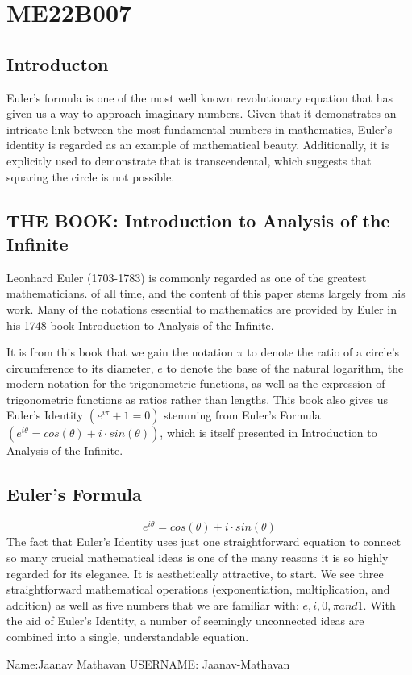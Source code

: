 \section{ME22B007}
\subsection{Introducton}
Euler's formula is one of the most well known revolutionary equation that has given us a way to approach imaginary numbers. Given that it demonstrates an intricate link between the most fundamental numbers in mathematics, Euler's identity is regarded as an example of mathematical beauty. Additionally, it is explicitly used to demonstrate that is transcendental, which suggests that squaring the circle is not possible.
\subsection{THE BOOK: Introduction to Analysis of the Infinite}
Leonhard Euler (1703-1783) is commonly regarded as one of the greatest mathematicians.
of all time, and the content of this paper stems largely from his work.
Many of the notations essential to mathematics are provided by Euler in his 1748 book Introduction to Analysis of the Infinite.

 It is from this book that we gain the
notation $\pi$ to denote the ratio of a circle’s circumference to its diameter, $e$ to denote the base
of the natural logarithm, the modern notation for the trigonometric functions, as well as the
expression of trigonometric functions as ratios rather than lengths. This book also gives us
Euler’s Identity $(e^{i\pi} + 1 = 0)$ stemming from Euler’s Formula $(e^{i\theta} = cos(\theta) + i \cdot sin(\theta))$, which
is itself presented in Introduction to Analysis of the Infinite.

\subsection{Euler's Formula}
$$e^{i \theta}=cos(\theta)+i \cdot sin(\theta)$$
The fact that Euler's Identity uses just one straightforward equation to connect so many crucial mathematical ideas is one of the many reasons it is so highly regarded for its elegance. It is aesthetically attractive, to start. We see three straightforward mathematical operations (exponentiation, multiplication, and addition) as well as five numbers that we are familiar with: $e, i,0, \pi and 1.$ With the aid of Euler's Identity, a number of seemingly unconnected ideas are combined into a single, understandable equation.


Name:Jaanav Mathavan
USERNAME: Jaanav-Mathavan
